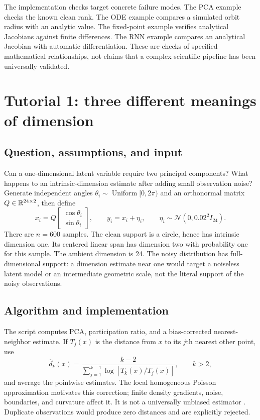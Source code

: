 The implementation checks target concrete failure modes. The PCA example checks the known clean rank. The ODE example compares a simulated orbit radius with an analytic value. The fixed-point example verifies analytical Jacobians against finite differences. The RNN example compares an analytical Jacobian with automatic differentiation. These are checks of specified mathematical relationships, not claims that a complex scientific pipeline has been universally validated.

\section{Tutorial 1: three different meanings of dimension}
\subsection{Question, assumptions, and input}
Can a one-dimensional latent variable require two principal components? What happens to an intrinsic-dimension estimate after adding small observation noise? Generate independent angles $\theta_i\sim\operatorname{Uniform}[0,2\pi)$ and an orthonormal matrix $Q\in\mathbb{R}^{24\times2}$, then define
\begin{equation}\label{eq:tutorial-circle}
x_i=Q\begin{bmatrix}\cos\theta_i\\\sin\theta_i\end{bmatrix},
\qquad y_i=x_i+\eta_i,\qquad
\eta_i\sim\mathcal N(0,0.02^2I_{24}).
\end{equation}
There are $n=600$ samples. The clean support is a circle, hence has intrinsic dimension one. Its centered linear span has dimension two with probability one for this sample. The ambient dimension is 24. The noisy distribution has full-dimensional support: a dimension estimate near one would target a noiseless latent model or an intermediate geometric scale, not the literal support of the noisy observations.

\subsection{Algorithm and implementation}
The script computes PCA, participation ratio, and a bias-corrected nearest-neighbor estimate. If $T_j(x)$ is the distance from $x$ to its $j$th nearest other point, use
\begin{equation}
\widehat d_k(x)=\frac{k-2}{\sum_{j=1}^{k-1}\log[T_k(x)/T_j(x)]},\qquad k>2,
\end{equation}
and average the pointwise estimates. The local homogeneous Poisson approximation motivates this correction; finite density gradients, noise, boundaries, and curvature affect it. It is not a universally unbiased estimator \citep{levina2004}. Duplicate observations would produce zero distances and are explicitly rejected.


